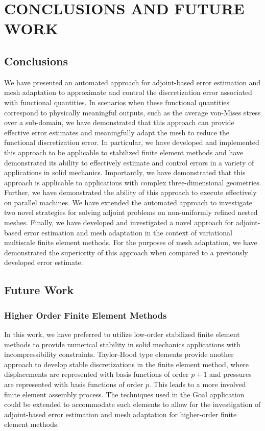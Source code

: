\chapter{CONCLUSIONS AND FUTURE WORK}
\label{chap:conclusions}

\section{Conclusions}

We have presented an automated approach for adjoint-based error estimation and mesh
adaptation to approximate and control the discretization error associated with
functional quantities. In scenarios when these functional quantities correspond
to physically meaningful outputs, such as the average von-Mises stress over a
sub-domain, we have demonstrated that this approach can provide effective error
estimates and meaningfully adapt the mesh to reduce the functional
discretization error. In particular, we have developed and implemented this approach
to be applicable to stabilized finite element methods and have demonstrated its
ability to effectively estimate and control errors in a variety of applications
in solid mechanics. Importantly, we have demonstrated that this approach is applicable
to applications with complex three-dimensional geometries.
Further, we have demonstrated the ability of this approach
to execute effectively on parallel machines. We have extended the
automated approach to investigate two novel strategies for solving adjoint problems
on non-uniformly refined nested meshes. Finally, we have developed and
investigated a novel approach for adjoint-based error estimation and mesh adaptation
in the context of variational multiscale finite element methods. For the purposes
of mesh adaptation, we have demonstrated the superiority of this approach when compared
to a previously developed error estimate.

\section{Future Work}

\subsection{Higher Order Finite Element Methods}

In this work, we have preferred to utilize low-order stabilized
finite element methods to provide numerical stability in solid
mechanics applications with incompressibility constraints.
Taylor-Hood type elements provide another approach to develop
stable discretizations in the finite element method, where
displacements are represented with basis functions of order
$p+1$ and pressures are represented with basis functions of
order $p$. This leads to a more involved finite element assembly
process. The techniques used in the Goal application
could be extended to accommodate such elements to allow for the
investigation of adjoint-based  error estimation and mesh adaptation
for higher-order finite element methods.

